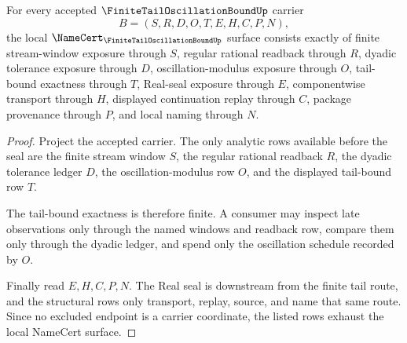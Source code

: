 \begin{theorem}
\label{thm:finite-tail-oscillation-bound-namecert-obligations}
For every accepted $\FiniteTailOscillationBoundUp$ carrier
$$
B=(S,R,D,O,T,E,H,C,P,N),
$$
the local $\NameCert_{\FiniteTailOscillationBoundUp}$ surface consists exactly of finite stream-window exposure through $S$, regular rational readback through $R$, dyadic tolerance exposure through $D$, oscillation-modulus exposure through $O$, tail-bound exactness through $T$, Real-seal exposure through $E$, componentwise transport through $H$, displayed continuation replay through $C$, package provenance through $P$, and local naming through $N$.
\end{theorem}
\begin{proof}
Project the accepted carrier. The only analytic rows available before the seal are the finite stream window $S$, the regular rational readback $R$, the dyadic tolerance ledger $D$, the oscillation-modulus row $O$, and the displayed tail-bound row $T$.

The tail-bound exactness is therefore finite. A consumer may inspect late observations only through the named windows and readback row, compare them only through the dyadic ledger, and spend only the oscillation schedule recorded by $O$.

Finally read $E,H,C,P,N$. The Real seal is downstream from the finite tail route, and the structural rows only transport, replay, source, and name that same route. Since no excluded endpoint is a carrier coordinate, the listed rows exhaust the local NameCert surface.
\end{proof}

